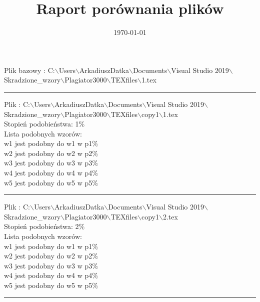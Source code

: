 \documentclass{article}
\begin{document}
\title{\huge\bfseries Raport porównania plików }
\date{\today}
\maketitle
\begin{flushleft}
Plik bazowy : C:$\backslash$Users$\backslash$ArkadiuszDatka$\backslash$Documents$\backslash$Visual Studio 2019$\backslash$Skradzione\_wzory$\backslash$Plagiator3000$\backslash$TEXfiles$\backslash$1.tex
\end{flushleft}
\hrule
\begin{flushleft}
Plik : C:$\backslash$Users$\backslash$ArkadiuszDatka$\backslash$Documents$\backslash$Visual Studio 2019$\backslash$Skradzione\_wzory$\backslash$Plagiator3000$\backslash$TEXfiles$\backslash$copy1$\backslash$1.tex\\
{\huge Stopień podobieństwa: 1\%} \\ 
Lista podobnych wzorów: \\ 
{\tiny w1 jest podobny do w1 w p1\% } \\ 
{\tiny w2 jest podobny do w2 w p2\% } \\ 
{\tiny w3 jest podobny do w3 w p3\% } \\ 
{\tiny w4 jest podobny do w4 w p4\% } \\ 
{\tiny w5 jest podobny do w5 w p5\% } \\ 

\end{flushleft}
\hrule
\begin{flushleft}
Plik : C:$\backslash$Users$\backslash$ArkadiuszDatka$\backslash$Documents$\backslash$Visual Studio 2019$\backslash$Skradzione\_wzory$\backslash$Plagiator3000$\backslash$TEXfiles$\backslash$copy1$\backslash$2.tex\\
{\huge Stopień podobieństwa: 2\%} \\ 
Lista podobnych wzorów: \\ 
{\tiny w1 jest podobny do w1 w p1\% } \\ 
{\tiny w2 jest podobny do w2 w p2\% } \\ 
{\tiny w3 jest podobny do w3 w p3\% } \\ 
{\tiny w4 jest podobny do w4 w p4\% } \\ 
{\tiny w5 jest podobny do w5 w p5\% } \\ 

\end{flushleft}
\hrule
\end{document}
